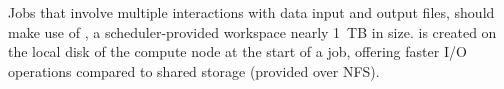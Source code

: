 
\noindent Jobs that involve multiple interactions with data input and output files, should make use of , 
a scheduler-provided workspace nearly 1~TB in size.
 is created on the local disk of the compute node at the start of a job, offering faster I/O operations 
compared to shared storage (provided over NFS).

